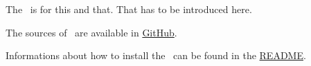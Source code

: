 %



%

The \pkg\ is for this and that. That has to be introduced here.

The sources of \pkg\ are available in \href{https://github.com/test-fullautomation/vscode-jsonp}{GitHub}.

Informations about how to install the \pkg\ can be found in the \href{https://github.com/test-fullautomation/vscode-jsonp/blob/develop/README.rst}{README}.

